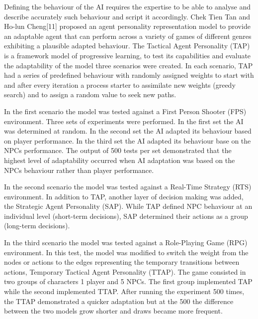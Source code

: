 \vspace{2mm}
Defining the behaviour of the AI requires the expertise to be able to analyse and describe accurately such behaviour and script it accordingly. Chek Tien Tan and Ho-lun Cheng[11] proposed an agent personality representation model to provide an adaptable agent that can perform across a variety of games of different genres exhibiting a plausible adapted behaviour. The Tactical Agent Personality (TAP) is a framework model of progressive learning, to test its capabilities and evaluate the adaptability of the model three scenarios were created. In each scenario, TAP had a series of predefined behaviour with randomly assigned weights to start with and after every iteration a process starter to assimilate new weights (greedy search) and to assign a random value to seek new paths.

\vspace{2mm}
In the first scenario the model was tested against a First Person Shooter (FPS) environment. Three sets of experiments were performed. In the first set the AI was determined at random. In the second set the AI adapted its behaviour based on player performance. In the third set the AI adapted its behaviour base on the NPCs performance. The output of 500 tests per set demonstrated that the highest level of adaptability occurred when AI adaptation was based on the NPCs behaviour rather than player performance.

\vspace{2mm}
In the second scenario the model was tested against a Real-Time Strategy (RTS) environment. In addition to TAP, another layer of decision making was added, the Strategic Agent Personality (SAP). While TAP defined NPC behaviour at an individual level (short-term decisions), SAP determined their actions as a group (long-term decisions).

\vspace{2mm}
In the third scenario the model was tested against a Role-Playing Game (RPG) environment. In this test, the model was modified to switch the weight from the nodes or actions to the edges representing the temporary transitions between actions, Temporary Tactical Agent Personality (TTAP). The game consisted in two groups of characters 1 player and 5 NPCs. The first group implemented TAP while the second implemented TTAP. After running the experiment 500 times, the TTAP demonstrated a quicker adaptation but at the 500 the difference between the two models grow shorter and draws became more frequent.

